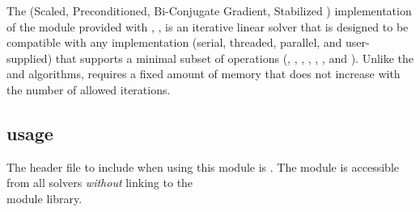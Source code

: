 
The {\spbcg} (Scaled, Preconditioned, Bi-Conjugate Gradient,
Stabilized \cite{Van:92}) implementation of the {\sunlinsol} module
provided with {\sundials}, {\sunlinsolspbcgs}, is an iterative linear
solver that is designed to be compatible with any {\nvector}
implementation (serial, threaded, parallel, and user-supplied) that
supports a minimal subset of operations (,
, , , ,
, and ).  Unlike the {\spgmr} and {\spfgmr}
algorithms, {\spbcg} requires a fixed amount of memory that does not
increase with the number of allowed iterations.

\subsection{{\sunlinsolspbcgs} usage}\label{ss:sunlinsol_spbcgs_usage}

The header file to include when using this module
is . The {\sunlinsolspbcgs} module
is accessible from all {\sundials} solvers \textit{without}
linking to the \\ \noindent
{} module library.


